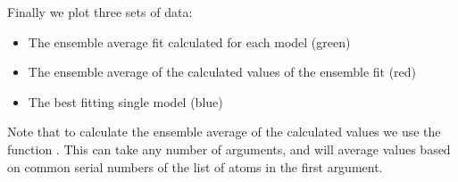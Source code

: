 \documentclass[a4paper,10pt,english]{sphinxmanual}
\begin{document}
%
\begin{sphinxVerbatim}[commandchars=\\\{\}]
  
   
	   
	    
		 \PYG{p}{[}\PYG{p}{]}
	 \PYG{p}{[}\PYG{p}{]}  
		  
		  
		  
		  
		  
\end{sphinxVerbatim}

Finally we plot three sets of data:
\begin{itemize}
\item {} 
The ensemble average fit calculated for each model (green)

\item {} 
The ensemble average of the calculated values of the ensemble fit (red)

\item {} 
The best fitting single model (blue)

\end{itemize}

Note that to calculate the ensemble average of the calculated values we use the function {\hyperref[\detokenize{reference/generated/paramagpy.fit.ensemble_average:paramagpy.fit.ensemble_average}]{}}. This can take any number of arguments, and will average values based on common serial numbers of the list of atoms in the first argument.
\end{document}
